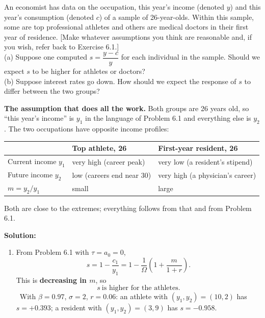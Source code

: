 \documentclass[12pt, letterpaper]{article}
\begin{document}
\begin{tcolorbox}[evenbox,title={Problem 6.2 \quad Savings Rates for Different People}]
\begin{tcolorbox}[questionbox]
An economist has data on the occupation, this year's income (denoted $y$) and this year's
consumption (denoted $c$) of a sample of 26-year-olds. Within this sample, some are top
professional athletes and others are medical doctors in their first year of residence. [Make
whatever assumptions you think are reasonable and, if you wish, refer back to Exercise
6.1.]\\[3pt]
(a) Suppose one computed $s=\dfrac{y-c}{y}$ for each individual in the sample. Should we
expect $s$ to be higher for athletes or doctors?\\[3pt]
(b) Suppose interest rates go down. How should we expect the response of $s$ to differ
between the two groups?
\end{tcolorbox}

\textbf{The assumption that does all the work.} Both groups are 26 years old, so ``this
year's income'' is $y_1$ in the language of Problem 6.1 and everything else is $y_2$. The two
occupations have opposite income profiles:
\begin{center}
\begin{tabular}{@{}lll@{}}
\toprule
 & \textbf{Top athlete, 26} & \textbf{First-year resident, 26} \\
\midrule
Current income $y_1$      & very high (career peak) & very low (a resident's stipend) \\
Future income $y_2$       & low (careers end near 30) & very high (a physician's career) \\
$m=y_2/y_1$               & small                    & large \\
\bottomrule
\end{tabular}
\end{center}
Both are close to the extremes; everything follows from that and from Problem 6.1.

\textbf{Solution:}
\begin{enumerate}

\item From Problem 6.1 with $\tau=a_0=0$,
\[
s=1-\frac{c_1}{y_1}=1-\frac{1}{\Omega}\left(1+\frac{m}{1+r}\right) .
\]
This is \textbf{decreasing in $m$}, so
\[
\boxed{s\ \text{is higher for the athletes.}}
\]
\checkmark\ With $\beta=0.97$, $\sigma=2$, $r=0.06$: an athlete with $(y_1,y_2)=(10,2)$ has
$s=+0.393$; a resident with $(y_1,y_2)=(3,9)$ has $s=-0.958$.


\end{enumerate}
\end{tcolorbox}
\end{document}

